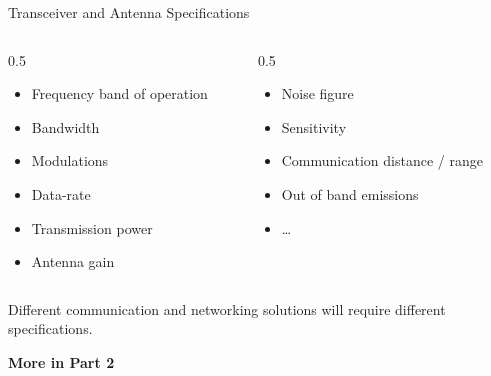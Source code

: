 \documentclass[aspectratio=169,11pt]{beamer}
\begin{document}
\begin{frame}{Transceiver and Antenna Specifications}
    \begin{columns}
        \begin{column}{0.5\textwidth}
            \begin{itemize}
                \item Frequency band of operation
                \item Bandwidth
                \item Modulations
                \item Data-rate
                \item Transmission power
                \item Antenna gain
            \end{itemize}
        \end{column}
        \begin{column}{0.5\textwidth}
            \begin{itemize}
                \item Noise figure
                \item Sensitivity
                \item Communication distance / range
                \item Out of band emissions
                \item \ldots
            \end{itemize}
        \end{column}
    \end{columns}
    
    \vspace{0.5cm}
    \begin{block}{}
        Different communication and networking solutions will require different specifications.
        
        \textbf{More in Part 2}
    \end{block}
\end{frame}
\end{document}
